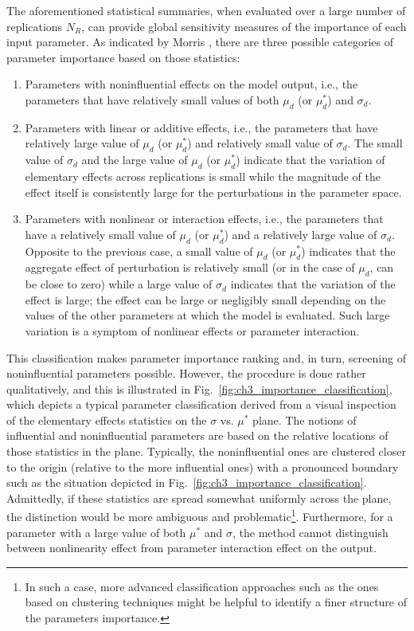 The aforementioned statistical summaries, when evaluated over a large number of replications $N_R$,
can provide global sensitivity measures of the importance of each input parameter.
As indicated by Morris \cite{Morris1991}, there are three possible categories of parameter importance based on those statistics:
\begin{enumerate}
	\item Parameters with noninfluential effects on the model output, i.e., the parameters that have relatively small values of both $\mu_d$ (or $\mu^*_d$) and $\sigma_d$.
	\item Parameters with linear or additive effects, i.e., the parameters that have relatively large value of $\mu_d$ (or $\mu^*_d$) and relatively small value of $\sigma_d$.
	The small value of $\sigma_d$ and the large value of $\mu_d$ (or $\mu^*_d$) indicate that the variation of elementary effects across replications is small while the magnitude of the effect itself is consistently large for the perturbations in the parameter space.
	\item Parameters with nonlinear or interaction effects, i.e., the parameters that have a relatively small value of $\mu_d$ (or $\mu^*_d$) and a relatively large value of $\sigma_d$.
	Opposite to the previous case, a small value of $\mu_d$ (or $\mu^*_d$) indicates that the aggregate effect of perturbation is relatively small (or in the case of $\mu_d$, can be close to zero) while a large value of $\sigma_d$ indicates that the variation of the effect is large; the effect can be large or negligibly small depending on the values of the other parameters at which the model is evaluated.
	Such large variation is a symptom of nonlinear effects or parameter interaction.
\end{enumerate}

This classification makes parameter importance ranking and, in turn, screening of noninfluential parameters possible.
However, the procedure is done rather qualitatively, and this is illustrated in Fig.~\ref{fig:ch3_importance_classification}, 
which depicts a typical parameter classification derived from a visual inspection of the elementary effects statistics on the $\sigma$ vs. $\mu^*$ plane.
The notions of influential and noninfluential parameters are based on the relative locations of those statistics in the plane.
Typically, the noninfluential ones are clustered closer to the origin (relative to the more influential ones) with a pronounced boundary such as the situation depicted in Fig.~\ref{fig:ch3_importance_classification}. 
Admittedly, if these statistics are spread somewhat uniformly across the plane, 
the distinction would be more ambiguous and problematic\footnote{In such a case, more advanced classification approaches such as the ones based on clustering techniques might be helpful to identify a finer structure of the parameters importance.}.
Furthermore, for a parameter with a large value of both $\mu^*$ and $\sigma$,
the method cannot distinguish between nonlinearity effect from parameter interaction effect on the output.

